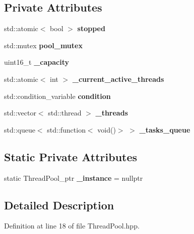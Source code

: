 \subsection*{Private Attributes}
\begin{DoxyCompactItemize}
\item 
std\+::atomic$<$ bool $>$ {\bfseries stopped}\hypertarget{class_thread_pool_a32bd96faf661653d2c57543ea06ef594}{}\label{class_thread_pool_a32bd96faf661653d2c57543ea06ef594}

\item 
std\+::mutex {\bfseries pool\+\_\+mutex}\hypertarget{class_thread_pool_a1702bd2e59ef365318884568fcd0e64d}{}\label{class_thread_pool_a1702bd2e59ef365318884568fcd0e64d}

\item 
uint16\+\_\+t {\bfseries \+\_\+capacity}\hypertarget{class_thread_pool_a4af63f1e0636c8fe9f65f2dce6707bb5}{}\label{class_thread_pool_a4af63f1e0636c8fe9f65f2dce6707bb5}

\item 
std\+::atomic$<$ int $>$ {\bfseries \+\_\+current\+\_\+active\+\_\+threads}\hypertarget{class_thread_pool_ac1e00273ac0d5da55c9b39a7708c0814}{}\label{class_thread_pool_ac1e00273ac0d5da55c9b39a7708c0814}

\item 
std\+::condition\+\_\+variable {\bfseries condition}\hypertarget{class_thread_pool_a6dd0c005d9bc726e976def8d6ac2d2a7}{}\label{class_thread_pool_a6dd0c005d9bc726e976def8d6ac2d2a7}

\item 
std\+::vector$<$ std\+::thread $>$ {\bfseries \+\_\+threads}\hypertarget{class_thread_pool_a690b74adb83a451f23f92ab130866e0f}{}\label{class_thread_pool_a690b74adb83a451f23f92ab130866e0f}

\item 
std\+::queue$<$ std\+::function$<$ void()$>$ $>$ {\bfseries \+\_\+tasks\+\_\+queue}\hypertarget{class_thread_pool_a55116f3beff6f64f505438abf7bbc686}{}\label{class_thread_pool_a55116f3beff6f64f505438abf7bbc686}

\end{DoxyCompactItemize}
\subsection*{Static Private Attributes}
\begin{DoxyCompactItemize}
\item 
static Thread\+Pool\+\_\+ptr {\bfseries \+\_\+instance} = nullptr\hypertarget{class_thread_pool_a278449de4978a298788236a3bcb5a975}{}\label{class_thread_pool_a278449de4978a298788236a3bcb5a975}

\end{DoxyCompactItemize}


\subsection{Detailed Description}


Definition at line 18 of file Thread\+Pool.\+hpp.

